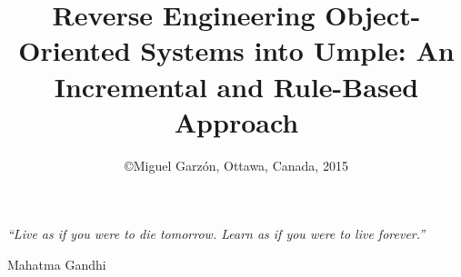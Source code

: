 \documentclass[a4paper, 11pt, oneside]{Thesis}  %
\begin{document}
\frontmatter      %

\title  {Reverse Engineering Object-Oriented Systems into Umple: An Incremental and Rule-Based Approach}
\date  {\normalsize \copyright  Miguel Garz\'{o}n, Ottawa, Canada, 2015}

\maketitle


\fancyhead{}  %

\rhead{\thepage}  %
\lhead{}  %

\pagestyle{fancy}  %

\pagestyle{empty}  %
\null\vfill
\textit{``Live as if you were to die tomorrow. Learn as if you were to live forever.''}

\begin{flushright}
Mahatma Gandhi   
\end{flushright}

\vfill\vfill\vfill\vfill\vfill\vfill\null
\clearpage  %
\end{document}
